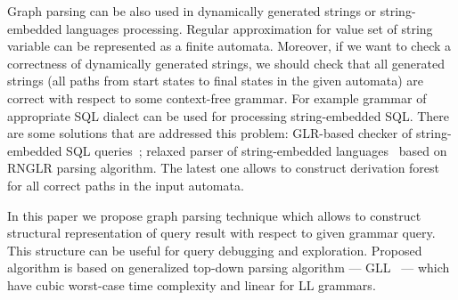 \documentclass{sig-alternate} %
\begin{document}
Graph parsing can be also used in dynamically generated strings or string-embedded languages processing. 
Regular approximation for value set of string variable can be represented as a finite automata.
Moreover, if we want to check a correctness of dynamically generated strings, we should check that all generated strings (all paths from start states to final states in the given automata) are correct with respect to some context-free grammar. 
For example grammar of appropriate SQL dialect can be used for processing string-embedded SQL.
There are some solutions that are addressed this problem: GLR-based checker of string-embedded SQL queries~\cite{Alvor1, Alvor2};
relaxed parser of string-embedded languages~\cite{relaxedRNGLR} based on RNGLR parsing algorithm.
The latest one allows to construct derivation forest for all correct paths in the input automata.

In this paper we propose graph parsing technique which allows to construct structural representation of query result with respect to given grammar query.
This structure can be useful for query debugging and exploration. 
Proposed algorithm is based on generalized top-down parsing algorithm --- GLL~\cite{GLL} --- which have cubic worst-case time complexity and linear for LL grammars.  













\end{document}
